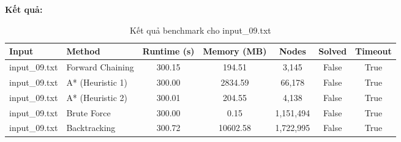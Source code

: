 \textbf{Kết quả:}
\begin{table}[H]
\centering
\begin{tabular}{|l|l|c|c|c|c|c|}
\hline
\textbf{Input} & \textbf{Method} & \textbf{Runtime (s)} & \textbf{Memory (MB)} & \textbf{Nodes} & \textbf{Solved} & \textbf{Timeout} \\
\hline
input\_09.txt & Forward Chaining & 300.15 & 194.51 & 3,145 & False & True \\
input\_09.txt & A* (Heuristic 1) & 300.00 & 2834.59 & 66,178 & False & True \\
input\_09.txt & A* (Heuristic 2) & 300.01 & 204.55 & 4,138 & False & True \\
input\_09.txt & Brute Force & 300.00 & 0.15 & 1,151,494 & False & True \\
input\_09.txt & Backtracking & 300.72 & 10602.58 & 1,722,995 & False & True \\
\hline
\end{tabular}
\caption{Kết quả benchmark cho input\_09.txt}
\end{table}

